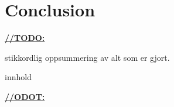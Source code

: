 \chapter{Conclusion}

\underline{\textbf{\LARGE //TODO:}}

stikkordlig oppsummering av alt som er gjort.

innhold

\underline{\textbf{\LARGE //ODOT:}}